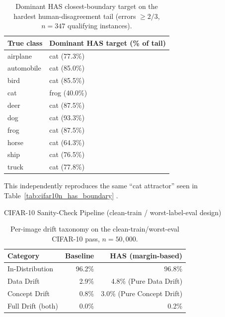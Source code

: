 \begin{table}[htbp]
\centering
\caption{Dominant HAS closest-boundary target on the hardest human-disagreement tail (errors $\geq 2/3$, $n=347$ qualifying instances).}
\label{tab:extra_semantic_direction}
\begin{tabular}{@{} l l @{}}
\toprule
\textbf{True class} & \textbf{Dominant HAS target (\% of tail)} \\
\midrule
airplane   & cat (77.3\%) \\
automobile & cat (85.0\%) \\
bird       & cat (85.5\%) \\
cat        & frog (40.0\%) \\
deer       & cat (87.5\%) \\
dog        & cat (93.3\%) \\
frog       & cat (87.5\%) \\
horse      & cat (64.3\%) \\
ship       & cat (76.5\%) \\
truck      & cat (77.8\%) \\
\bottomrule
\end{tabular}
\end{table}

This independently reproduces the same ``cat attractor'' seen in
Table~\ref{tab:cifar10n_has_boundary} .

CIFAR-10 Sanity-Check Pipeline (clean-train / worst-label-eval design)

\label{sec:extra_cifar10_sanity}


\begin{table}[htbp]
\centering
\caption{Per-image drift taxonomy on the clean-train/worst-eval CIFAR-10 pass, $n=50{,}000$.}
\label{tab:extra_cifar10_taxonomy}
\begin{tabular}{@{} l rr @{}}
\toprule
\textbf{Category} & \textbf{Baseline} & \textbf{HAS (margin-based)} \\
\midrule
In-Distribution    & 96.2\% & 96.8\% \\
Data Drift         & 2.9\%  & 4.8\%  (Pure Data Drift) \\
Concept Drift      & 0.8\%  & 3.0\%  (Pure Concept Drift) \\
Full Drift (both)  & 0.0\%  & 0.2\%  \\
\bottomrule
\end{tabular}
\end{table}

